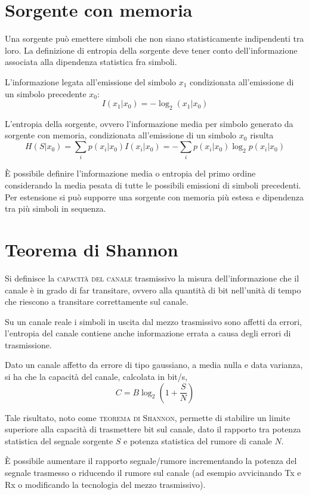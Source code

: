 \section{Sorgente con memoria}
Una sorgente può emettere simboli che non siano statisticamente indipendenti tra loro. La definizione di entropia della sorgente deve tener conto dell'informazione associata alla dipendenza statistica fra simboli.

L'informazione legata all'emissione del simbolo $x_1$ condizionata all'emissione di un simbolo precedente $x_0$:
\[
	I(x_1|x_0)=-\log_2(x_1|x_0)
\]

L'entropia della sorgente, ovvero l'informazione media per simbolo generato da sorgente con memoria, condizionata all'emissione di un simbolo $x_0$ risulta
\[
	H(S|x_0)=\sum_i p(x_i|x_0) I(x_i|x_0)=-\sum_i p(x_i|x_0)\log_2 p(x_i|x_0)\]

\`E possibile definire l'informazione media o entropia del primo ordine considerando la media pesata di tutte le possibili emissioni di simboli precedenti. Per estensione si può supporre una sorgente con memoria più estesa e dipendenza tra più simboli in sequenza.

\section{Teorema di Shannon}
Si definisce la \textsc{capacità del canale} trasmissivo la misura dell'informazione che il canale è in grado di far transitare, ovvero alla quantità di bit nell'unità di tempo che riescono a transitare correttamente sul canale.

Su un canale reale i simboli in uscita dal mezzo trasmissivo sono affetti da errori, l'entropia del canale contiene anche informazione errata a causa degli errori di trasmissione.

Dato un canale affetto da errore di tipo gaussiano, a media nulla e data varianza, si ha che la capacità del canale, calcolata in bit/s,
\begin{equation}
	C=B \log_2 \left(1+\frac{S}{N}\right)
\end{equation}

Tale risultato, noto come \textsc{teorema di Shannon}, permette di stabilire un limite superiore alla capacità di trasmettere bit sul canale, dato il rapporto tra potenza statistica del segnale sorgente $S$ e potenza statistica del rumore di canale $N$.

\begin{nota}
	\`E possibile aumentare il rapporto segnale/rumore incrementando la potenza del segnale trasmesso o riducendo il rumore sul canale (ad esempio avvicinando Tx e Rx o modificando la tecnologia del mezzo trasmissivo).
\end{nota}
